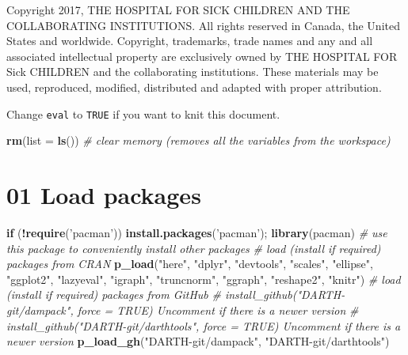 \documentclass[
]{article}
\newenvironment{Shaded}{\begin{snugshade}}{\end{snugshade}}
\newcommand{\CommentTok}[1]{\textcolor[rgb]{0.56,0.35,0.01}{\textit{#1}}}
\newcommand{\ControlFlowTok}[1]{\textcolor[rgb]{0.13,0.29,0.53}{\textbf{#1}}}
\newcommand{\DataTypeTok}[1]{\textcolor[rgb]{0.13,0.29,0.53}{#1}}
\newcommand{\KeywordTok}[1]{\textcolor[rgb]{0.13,0.29,0.53}{\textbf{#1}}}
\newcommand{\NormalTok}[1]{#1}
\newcommand{\OperatorTok}[1]{\textcolor[rgb]{0.81,0.36,0.00}{\textbf{#1}}}
\newcommand{\StringTok}[1]{\textcolor[rgb]{0.31,0.60,0.02}{#1}}
\begin{document}
Copyright 2017, THE HOSPITAL FOR SICK CHILDREN AND THE COLLABORATING
INSTITUTIONS. All rights reserved in Canada, the United States and
worldwide. Copyright, trademarks, trade names and any and all associated
intellectual property are exclusively owned by THE HOSPITAL FOR Sick
CHILDREN and the collaborating institutions. These materials may be
used, reproduced, modified, distributed and adapted with proper
attribution.

\newpage

Change \texttt{eval} to \texttt{TRUE} if you want to knit this document.

\begin{Shaded}
\begin{Highlighting}[]
\KeywordTok{rm}\NormalTok{(}\DataTypeTok{list =} \KeywordTok{ls}\NormalTok{())      }\CommentTok{# clear memory (removes all the variables from the workspace)}
\end{Highlighting}
\end{Shaded}

\hypertarget{load-packages}{%
\section{01 Load packages}\label{load-packages}}

\begin{Shaded}
\begin{Highlighting}[]
\ControlFlowTok{if}\NormalTok{ (}\OperatorTok{!}\KeywordTok{require}\NormalTok{(}\StringTok{'pacman'}\NormalTok{)) }\KeywordTok{install.packages}\NormalTok{(}\StringTok{'pacman'}\NormalTok{); }\KeywordTok{library}\NormalTok{(pacman) }\CommentTok{# use this package to conveniently install other packages}
\CommentTok{# load (install if required) packages from CRAN}
\KeywordTok{p_load}\NormalTok{(}\StringTok{"here"}\NormalTok{, }\StringTok{"dplyr"}\NormalTok{, }\StringTok{"devtools"}\NormalTok{, }\StringTok{"scales"}\NormalTok{, }\StringTok{"ellipse"}\NormalTok{, }\StringTok{"ggplot2"}\NormalTok{, }\StringTok{"lazyeval"}\NormalTok{, }\StringTok{"igraph"}\NormalTok{, }\StringTok{"truncnorm"}\NormalTok{, }\StringTok{"ggraph"}\NormalTok{, }\StringTok{"reshape2"}\NormalTok{, }\StringTok{"knitr"}\NormalTok{)                                               }
\CommentTok{# load (install if required) packages from GitHub}
\CommentTok{# install_github("DARTH-git/dampack", force = TRUE) Uncomment if there is a newer version}
\CommentTok{# install_github("DARTH-git/darthtools", force = TRUE) Uncomment if there is a newer version}
\KeywordTok{p_load_gh}\NormalTok{(}\StringTok{"DARTH-git/dampack"}\NormalTok{, }\StringTok{"DARTH-git/darthtools"}\NormalTok{) }
\end{Highlighting}
\end{Shaded}
\end{document}
